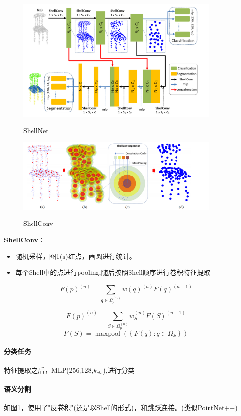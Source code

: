 \documentclass[a4paper,12pt]{article}
\begin{document}
	\begin{figure}[H]
	\begin{center}
		\includegraphics[width=0.9\textwidth]{img/ShellNet.png} 
		\caption{ShellNet}
	\end{center}
\end{figure}

	\begin{figure}[H]
		\begin{center}
			\includegraphics[width=0.9\textwidth]{img/ShellConv.png} 
			\caption{ShellConv}
		\end{center}
	\end{figure}


\textbf{ShellConv}：
\begin{itemize}
	\item 随机采样，图1(a)红点，画圆进行统计。
	\item 每个Shell中的点进行pooling,随后按照Shell顺序进行卷积特征提取
\end{itemize}
	$$
F(p)^{(n)}=\sum_{q \in \Omega_{p}^{(n)}} w(q)^{(n)} F(q)^{(n-1)}
$$

$$
F(p)^{(n)}=\sum_{S \in \Omega_{p}^{(n)}} w_{S}^{(n)} F(S)^{(n-1)}
$$
$$
F(S)=\operatorname{maxpool}\left(\left\{F(q): q \in \Omega_{S}\right\}\right)
$$

\paragraph{分类任务}
特征提取之后，MLP(256,128,$k_{cls}$),进行分类
\paragraph{语义分割} 如图1，使用了"反卷积"(还是以Shell的形式)，和跳跃连接。(类似PointNet++)
\end{document}
